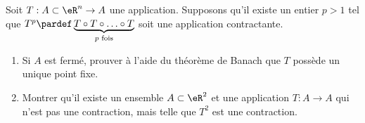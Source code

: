 
\begin{exercice}\label{exoTP20090002}

Soit $T : A \subset {\eR}^n \to A$ une application. Supposons qu'il existe un entier $p > 1$ tel que $T^p \pardef \underbrace{T \circ T \circ \ldots \circ T}_{\text{$p$ fois}}$ soit une application contractante.

\begin{enumerate}
\item
Si $A$ est fermé, prouver à l'aide du théorème de Banach que $T$ possède un unique point fixe.
\item
Montrer qu'il existe un ensemble $A\subset \eR^2$ et une application $T : A \to A$ qui n'est pas une contraction, mais telle que $T^2$ est une contraction.
\end{enumerate}

\end{exercice}
